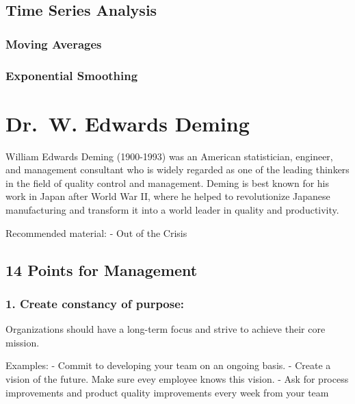 \documentclass[11pt]{article}
\begin{document}
\hypertarget{time-series-analysis}{%
\subsection{Time Series Analysis}\label{time-series-analysis}}

\hypertarget{moving-averages}{%
\subsubsection{Moving Averages}\label{moving-averages}}

\hypertarget{exponential-smoothing}{%
\subsubsection{Exponential Smoothing}\label{exponential-smoothing}}

    

    \hypertarget{dr.-w.-edwards-deming}{%
\section{Dr.~W. Edwards Deming}\label{dr.-w.-edwards-deming}}

    William Edwards Deming (1900-1993) was an American statistician,
engineer, and management consultant who is widely regarded as one of the
leading thinkers in the field of quality control and management. Deming
is best known for his work in Japan after World War II, where he helped
to revolutionize Japanese manufacturing and transform it into a world
leader in quality and productivity.

Recommended material: - Out of the Crisis

\hypertarget{points-for-management}{%
\subsection{14 Points for Management}\label{points-for-management}}

\hypertarget{create-constancy-of-purpose}{%
\subsubsection{1. Create constancy of
purpose:}\label{create-constancy-of-purpose}}

Organizations should have a long-term focus and strive to achieve their
core mission.

Examples: - Commit to developing your team on an ongoing basis. - Create
a vision of the future. Make sure evey employee knows this vision. - Ask
for process improvements and product quality improvements every week
from your team
\end{document}
